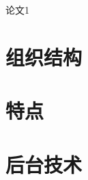 \documentclass[UTF8]{ctexart}
\begin{document}
论文1~\cite{tang2008arnetminer}
~\cite{tang2008topic}
~\cite{tang2011unified}
~\cite{wang2011adana}
~\cite{zhang2018name}


\part{组织结构}

\part{特点}
\part{后台技术}


\end{document}
